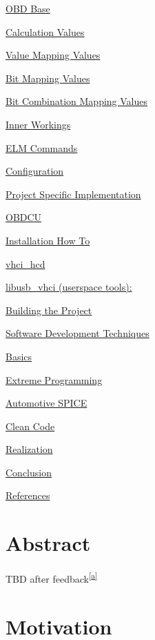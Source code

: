 {\protect\hyperlink{h.fbh3ldin73fx}{OBD Base}}

{\protect\hyperlink{h.tbf8n411o12j}{Calculation Values}}

{\protect\hyperlink{h.t1w3v8o28dma}{Value Mapping Values}}

{\protect\hyperlink{h.nvvniy6ibvmm}{Bit Mapping Values}}

{\protect\hyperlink{h.v3wlh8gjmo1s}{Bit Combination Mapping Values}}

{\protect\hyperlink{h.q2wfq2ktke27}{Inner Workings}}

{\protect\hyperlink{h.wbiklph9gdnl}{ELM Commands}}

{\protect\hyperlink{h.8c6emwe3lhuv}{Configuration}}

{\protect\hyperlink{h.upb9og5wn4q0}{Project Specific Implementation}}

{\protect\hyperlink{h.dfu1gktb8xw}{OBDCU}}

{\protect\hyperlink{h.pxkpe4k3lbn1}{Installation How To}}

{\protect\hyperlink{h.agltrea2kef8}{vhci\_hcd}}

{\protect\hyperlink{h.8woybtsjfs8s}{libusb\_vhci (userspace tools):}}

{\protect\hyperlink{h.73mzfu9s6v0d}{Building the Project}}

{\protect\hyperlink{h.totk00jqaso2}{Software Development Techniques}}

{\protect\hyperlink{h.qmc1u1ly9e76}{Basics}}

{\protect\hyperlink{h.al3idr34x902}{Extreme Programming}}

{\protect\hyperlink{h.98eiyanf314e}{Automotive SPICE}}

{\protect\hyperlink{h.mifm7q3zf07v}{Clean Code}}

{\protect\hyperlink{h.8nawqkcgevsc}{Realization}}

{\protect\hyperlink{h.xkuwr51j6zad}{Conclusion}}

{\protect\hyperlink{h.mzh64o82gvdq}{References}}

\hypertarget{h.w1vd037gtz71}{\section{\texorpdfstring{{Abstract}}{Abstract}}\label{h.w1vd037gtz71}}

{TBD after feedback}\textsuperscript{\protect\hyperlink{cmnt1}{{[}a{]}}}

\hypertarget{h.ca2gtl63cpbb}{\section{\texorpdfstring{{Motivation}}{Motivation}}\label{h.ca2gtl63cpbb}}

